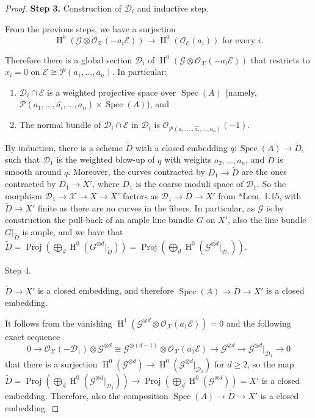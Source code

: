 \documentclass{amsart}
\newcommand{\oH}{\operatorname{H}}
\newcommand{\cD}{\mathcal{D}}
\newcommand{\cE}{\mathcal{E}}
\newcommand{\cG}{\mathcal{G}}
\newcommand{\cO}{\mathcal{O}}
\newcommand{\cP}{\mathcal{P}}
\newcommand{\cX}{\mathcal{X}}
\newcommand{\spec}{\operatorname{Spec}}
\theoremstyle{definition}
\begin{document}
\begin{proof}
\textbf{Step 3.} Construction of $\cD_i$ and inductive step. 

From the previous steps, we have a surjection
$$ \oH^0(\cG\otimes \cO_{\cX}(-a_i\cE))\to \oH^0(\cO_{\cE}(a_i)) \text{ for every }i.$$

Therefore there is a global section $\cD_i$ of $\oH^0(\cG\otimes \cO_{\cX}(-a_i\cE))$ that restricts to $x_i=0$ on $\cE\cong \cP(a_1,...,a_n)$. 
In particular:
\begin{enumerate}
    \item $\cD_i\cap \cE$ is a weighted projective space over $\spec(A)$ (namely, $\cP(a_1,...,\widehat{a_i},...,a_n)\times \spec(A)$), and
    \item The normal bundle of $\cD_i\cap \cE$ in $\cD_i$ is $\cO_{\cP(a_1,...,\widehat{a_i},...,a_n)}(-1)$.
\end{enumerate} 
By induction, there is a scheme $\widetilde{D}$ with a closed embedding $q:\spec(A)\to \widetilde{D}$, such that $\cD_1$ is the weighted blow-up of $q$ with weights $a_2,...,a_n$, and $\widetilde{D}$ is smooth around $q$.
Moreover, the curves contracted by $D_1\to \widetilde{D}$ are the ones contracted by $D_1\to X'$, where $D_1$ is the coarse moduli space of $\cD_1$. So the morphism $\cD_1\to \cX\to X\to X'$ factors as $\cD_1\to \widetilde{D}\to X'$ from \cite{debarre_book}*{Lem. 1.15}, with $\widetilde{D}\to X'$ finite as there are no curves in the fibers. In particular, as $\cG$ is by construction the pull-back of an ample line bundle $G$ on $X'$, also the line bundle $G|_{\widetilde{D}}$ is ample, and we have that $\widetilde{D}= \operatorname{Proj}(\bigoplus_d \oH^0(G^{\otimes d}|_{\widetilde{D}})) = \operatorname{Proj}(\bigoplus_d \oH^0(\cG^{\otimes d}|_{\cD_1}))$.

\begin{bf}Step 4.\end{bf} $\widetilde{D}\to X'$ is a closed embedding, and therefore $\spec(A)\to \widetilde{D}\to X'$ is a closed embedding.

It follows from the vanishing $\oH^1(\cG^{\otimes d }\otimes \cO_{\cX}(a_1\cE))=0$ and the following exact sequence
$$ 0\to \cO_\cX(-\cD_1)\otimes \cG^{\otimes d}\cong \cG^{\otimes (d-1)}\otimes \cO_\cX(a_1\cE)\to \cG^{\otimes d} \to \cG^{\otimes d}|_{\cD_1}\to 0$$
that there is a surjection $\oH^0(\cG^{\otimes d})\to \oH^0(\cG^{\otimes d}|_{\cD_1})$ for $d\ge2$, so the map $\widetilde{D} = \operatorname{Proj}(\bigoplus_d \oH^0(\cG^{\otimes d}|_{\cD_1}))\to \operatorname{Proj}(\bigoplus_d \oH^0(\cG^{\otimes d}))=X'$ is a closed embedding. Therefore, also the composition $\spec(A)\to \widetilde{D}\to X'$ is a closed embedding.



\end{proof}
\end{document}
